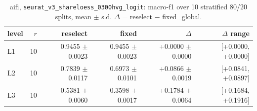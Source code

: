 \begin{table}[t]
\centering
\small
\begin{tabular}{lrrrrr}
\toprule
level & $r$ & reselect & fixed & $\Delta$ & $\Delta$ range \\
\midrule
L1 & 10 & 0.9455 $\pm$ 0.0023 & 0.9455 $\pm$ 0.0023 & +0.0000 $\pm$ 0.0000 & [+0.0000, +0.0000] \\
L2 & 10 & 0.7839 $\pm$ 0.0117 & 0.6973 $\pm$ 0.0101 & +0.0866 $\pm$ 0.0019 & [+0.0841, +0.0897] \\
L3 & 10 & 0.5381 $\pm$ 0.0060 & 0.3598 $\pm$ 0.0017 & +0.1784 $\pm$ 0.0064 & [+0.1684, +0.1916] \\
\bottomrule
\end{tabular}
\caption{aifi, \texttt{seurat\_v3\_shareloess\_0300hvg\_logit}: macro-f1 over 10 stratified 80/20 splits, mean $\pm$ s.d. $\Delta$ = reselect $-$ fixed\_global.}
\label{tab:repeats-aifi-macro_f1}
\end{table}